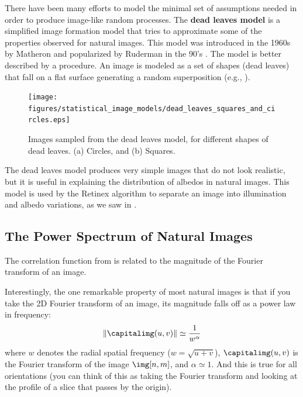 There have been many efforts to model the minimal set of assumptions needed in order to produce image-like random processes. The {\bf dead leaves model } is a simplified image formation model that tries to approximate some of the properties observed for natural images. This model was introduced in the 1960s by Matheron \cite{Matheron1975} and popularized by Ruderman in the 90's \cite{Ruderman1997}. The model is better described by a procedure. An image is modeled as a set of shapes (dead leaves) that fall on a flat surface generating a random superposition (e.g., \fig{\ref{fig:deadleaves}}). 

\begin{figure}
\centerline{
\texttt{[image: figures/statistical\_image\_models/dead\_leaves\_squares\_and\_circles.eps]}
} 
\caption{Images sampled from the dead leaves model, for different shapes of dead leaves. (a) Circles, and (b) Squares.
} 
\label{fig:deadleaves}
\end{figure}

The dead leaves model produces very simple images that do not look realistic, but it is useful in explaining the distribution of albedos in natural images. This model is used by the Retinex algorithm \cite{Land83} to separate an image into illumination and albedo variations, as we saw in \chap{\ref{chapter:image_derivatives}}. 

\subsection{The Power Spectrum of Natural Images}

The correlation function from \eqn{\ref{eq:correlation_between_two_pixels}} is related to the magnitude of the Fourier transform of an image. 

Interestingly, the one remarkable property of most natural images is that if you take the 2D Fourier transform of an image, its magnitude falls off as a power law in frequency:
\begin{equation}
\lVert \capitalimg (u,v) \rVert \simeq \frac{1}{  w  ^ \alpha}
\label{eq:power_law_natural_images}
\end{equation}
where $w$ denotes the radial spatial frequency ($w = \sqrt{u + v}$), $\capitalimg(u,v)$ is the Fourier transform of the image $\img [n,m]$, and $\alpha \simeq 1$. And this is true for all orientations (you can think of this as taking the Fourier transform and looking at the profile of a slice that passes by the origin). 

